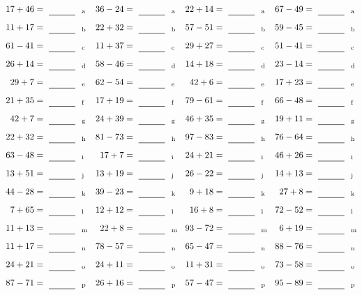 \documentclass
[
  draft    = true,
  fontsize = 11pt,
  parskip  = half-
]
{scrartcl}
\begin{document}
\clearpage
\begin{align*}
    \pline{17+46}&=\rline{a}
  & \pline{36-24}&=\rline{a}
  & \pline{22+14}&=\rline{a}
  & \pline{67-49}&=\rline{a} \\[1ex]
    \pline{11+17}&=\rline{b}
  & \pline{22+32}&=\rline{b}
  & \pline{57-51}&=\rline{b}
  & \pline{59-45}&=\rline{b} \\[1ex]
    \pline{61-41}&=\rline{c}
  & \pline{11+37}&=\rline{c}
  & \pline{29+27}&=\rline{c}
  & \pline{51-41}&=\rline{c} \\[1ex]
    \pline{26+14}&=\rline{d}
  & \pline{58-46}&=\rline{d}
  & \pline{14+18}&=\rline{d}
  & \pline{23-14}&=\rline{d} \\[1ex]
    \pline{29+7}&=\rline{e}
  & \pline{62-54}&=\rline{e}
  & \pline{42+6}&=\rline{e}
  & \pline{17+23}&=\rline{e} \\[1ex]
    \pline{21+35}&=\rline{f}
  & \pline{17+19}&=\rline{f}
  & \pline{79-61}&=\rline{f}
  & \pline{66-48}&=\rline{f} \\[1ex]
    \pline{42+7}&=\rline{g}
  & \pline{24+39}&=\rline{g}
  & \pline{46+35}&=\rline{g}
  & \pline{19+11}&=\rline{g} \\[1ex]
    \pline{22+32}&=\rline{h}
  & \pline{81-73}&=\rline{h}
  & \pline{97-83}&=\rline{h}
  & \pline{76-64}&=\rline{h} \\[1ex]
    \pline{63-48}&=\rline{i}
  & \pline{17+7}&=\rline{i}
  & \pline{24+21}&=\rline{i}
  & \pline{46+26}&=\rline{i} \\[1ex]
    \pline{13+51}&=\rline{j}
  & \pline{13+19}&=\rline{j}
  & \pline{26-22}&=\rline{j}
  & \pline{14+13}&=\rline{j} \\[1ex]
    \pline{44-28}&=\rline{k}
  & \pline{39-23}&=\rline{k}
  & \pline{9+18}&=\rline{k}
  & \pline{27+8}&=\rline{k} \\[1ex]
    \pline{7+65}&=\rline{l}
  & \pline{12+12}&=\rline{l}
  & \pline{16+8}&=\rline{l}
  & \pline{72-52}&=\rline{l} \\[1ex]
    \pline{11+13}&=\rline{m}
  & \pline{22+8}&=\rline{m}
  & \pline{93-72}&=\rline{m}
  & \pline{6+19}&=\rline{m} \\[1ex]
    \pline{11+17}&=\rline{n}
  & \pline{78-57}&=\rline{n}
  & \pline{65-47}&=\rline{n}
  & \pline{88-76}&=\rline{n} \\[1ex]
    \pline{24+21}&=\rline{o}
  & \pline{24+11}&=\rline{o}
  & \pline{11+31}&=\rline{o}
  & \pline{73-58}&=\rline{o} \\[1ex]
    \pline{87-71}&=\rline{p}
  & \pline{26+16}&=\rline{p}
  & \pline{57-47}&=\rline{p}
  & \pline{95-89}&=\rline{p}
\end{align*}
\end{document}

